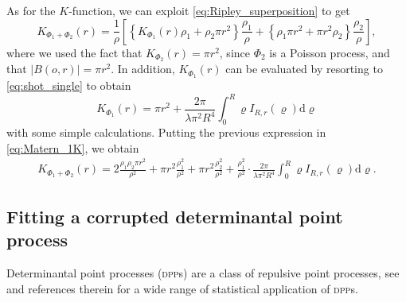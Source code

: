\documentclass[11pt,a4paper,oneside]{article}
\newcommand{\dd}{\mathrm d}
\theoremstyle{definition}
\theoremstyle{remark}
\begin{document}


As for the $K$-function, we can exploit \eqref{eq:Ripley_superposition} to get
\begin{equation} \label{eq:Matern_1K}
     K_{\Phi_1 + \Phi_2}(r) = \frac{1}{\rho} \left[ \left\{K_{\Phi_1}(r) \rho_1 + \rho_2 \pi r^2\right\} \frac{\rho_1}{\rho} +  \left\{ \rho_1 \pi r^2 + \pi r^2\rho_2\right\} \frac{\rho_2}{\rho}  \right] ,
\end{equation}
where we used the fact that $K_{\Phi_2}(r) = \pi r^2 $, since $\Phi_2$ is a Poisson process, and that $|B(o,r)|  = \pi r^2$. In addition,  $ K_{\Phi_1}(r)$ can be evaluated by resorting to \eqref{eq:shot_single} to obtain
\[
K_{\Phi_1}(r)
=
\pi r^2
+
\frac{2\pi}{\lambda \pi^2 R^4}
\int_0^{R}
\varrho I_{R,r} (\varrho) \dd \varrho
\]
with some simple calculations. Putting the previous expression in  \eqref{eq:Matern_1K}, we obtain 
\[
\begin{split}
     K_{\Phi_1 + \Phi_2}(r) =  2\frac{\rho_1\rho_2 \pi r^2}{\rho^2} +
    \pi r^2\frac{\rho_1^2}{\rho^2} + \pi r^2 \frac{\rho_2^2}{\rho^2} + \frac{\rho_1^2}{\rho^2} \cdot\frac{2\pi}{\lambda \pi^2 R^4}
\int_0^{R}
\varrho I_{R,r} (\varrho) \dd \varrho  .
\end{split}
\]

\subsection{Fitting a corrupted determinantal point process} \label{app:corrupted_dpp}

Determinantal point processes (\textsc{dpp}s)  are a class of repulsive point processes, see \citet{Lavancier2015,KuleszaTaskar2012} and references therein for a wide range of statistical application of \textsc{dpp}s.
\end{document}
